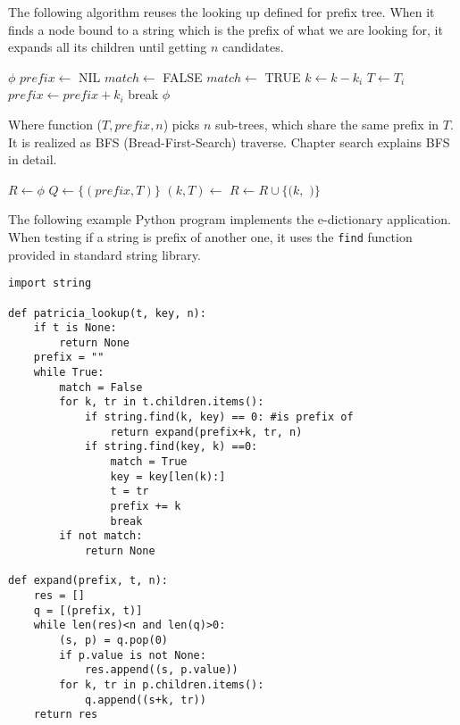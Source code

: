 \documentclass{article}
\begin{document}
The following algorithm reuses the looking up defined for prefix tree. When it
finds a node bound to a string which is the prefix of what we are looking for,
it expands all its children until getting $n$ candidates.

\begin{algorithmic}[1]
     \State \Return $\phi$
  \EndIf
  \State $prefix \gets$ NIL
  \Repeat
    \State $match \gets$ FALSE
        \State \Return {}
      \EndIf
        \State $match \gets$ TRUE
        \State $k \gets k - k_i$
        \State $T \gets T_i$
        \State $prefix \gets prefix + k_i$
        \State break
      \EndIf
    \EndFor
  \State \Return $\phi$
\EndFunction
\end{algorithmic}

Where function ($T, prefix, n$) picks $n$ sub-trees, which
share the same prefix in $T$. It is realized as BFS (Bread-First-Search) traverse. Chapter search
explains BFS in detail.

\begin{algorithmic}[1]
  \State $R \gets \phi$
  \State $Q \gets \{(prefix, T)\}$
    \State $(k, T) \gets$ 
      \State $R \gets R \cup \{(k, $  $)\}$
    \EndIf
      \State {}
    \EndFor
  \EndWhile
\EndFunction
\end{algorithmic}

The following example Python program implements the e-dictionary application.
When testing if a string is prefix of another one, it uses the \texttt{find}
function provided in standard string library.

\lstset{language=Python}
\begin{lstlisting}
import string

def patricia_lookup(t, key, n):
    if t is None:
        return None
    prefix = ""
    while True:
        match = False
        for k, tr in t.children.items():
            if string.find(k, key) == 0: #is prefix of
                return expand(prefix+k, tr, n)
            if string.find(key, k) ==0:
                match = True
                key = key[len(k):]
                t = tr
                prefix += k
                break
        if not match:
            return None

def expand(prefix, t, n):
    res = []
    q = [(prefix, t)]
    while len(res)<n and len(q)>0:
        (s, p) = q.pop(0)
        if p.value is not None:
            res.append((s, p.value))
        for k, tr in p.children.items():
            q.append((s+k, tr))
    return res
\end{lstlisting}
\end{document}
